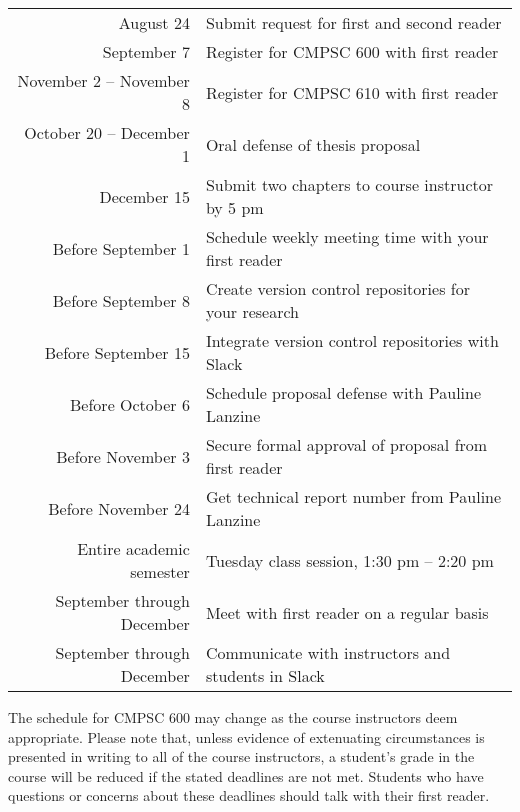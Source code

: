 \begin{center}
\begin{tabular}{r|l}

\hline

August 24                & Submit request for first and second reader \\
September 7              & Register for CMPSC 600 with first reader \\
November 2 -- November 8 & Register for CMPSC 610 with first reader \\
October 20 -- December 1 & Oral defense of thesis proposal \\
December 15              & Submit two chapters to course instructor by 5 pm \\

\hline

Before September 1 & Schedule weekly meeting time with your first reader \\
Before September 8 & Create version control repositories for your research \\
Before September 15 & Integrate version control repositories with Slack \\
Before October 6   & Schedule proposal defense with Pauline Lanzine \\
Before November 3  & Secure formal approval of proposal from first reader \\
Before November 24 & Get technical report number from Pauline Lanzine \\

\hline

Entire academic semester   & Tuesday class session, 1:30 pm -- 2:20 pm \\
September through December & Meet with first reader on a regular basis \\
September through December & Communicate with instructors and students in Slack \\

\hline

\end{tabular}
\end{center}

\noindent The schedule for CMPSC 600 may change as the course instructors deem appropriate. Please note that, unless
evidence of extenuating circumstances is presented in writing to all of the course instructors, a student's grade in the
course will be reduced if the stated deadlines are not met. Students who have questions or concerns about these
deadlines should talk with their first reader.

